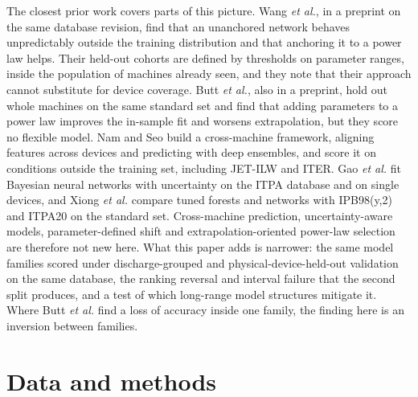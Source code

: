 \documentclass[aip,pop,preprint,amsmath,amssymb]{revtex4-2}
\begin{document}
The closest prior work covers parts of this picture. Wang \emph{et al.}\cite{wang},
in a preprint on the same database revision, find that an unanchored network behaves unpredictably
outside the training distribution and that anchoring it to a power law helps.
Their held-out cohorts are defined by thresholds on parameter ranges, inside
the population of machines already seen, and they note that their approach
cannot substitute for device coverage. Butt \emph{et al.}\cite{butt}, also
in a preprint, hold out whole machines on the same standard set and find that adding parameters to a
power law improves the in-sample fit and worsens extrapolation, but they score
no flexible model. Nam and Seo\cite{namseo} build a cross-machine framework,
aligning features across devices and predicting with deep ensembles, and score
it on conditions outside the training set, including JET-ILW and ITER. Gao
\emph{et al.}\cite{gao} fit Bayesian neural networks with uncertainty on the
ITPA database and on single devices, and Xiong \emph{et al.}\cite{xiong}
compare tuned forests and networks with IPB98(y,2) and ITPA20 on the standard
set. Cross-machine prediction, uncertainty-aware models, parameter-defined
shift and extrapolation-oriented power-law selection are therefore not new
here. What this paper adds is narrower: the same model families scored under
discharge-grouped and physical-device-held-out validation on the same
database, the ranking reversal and interval failure that the second split
produces, and a test of which long-range model structures mitigate it. Where
Butt \emph{et al.} find a loss of accuracy inside one family, the finding
here is an inversion between families.

\section{Data and methods}
\label{sec:data}
\end{document}
